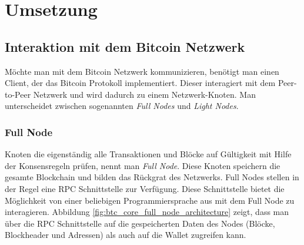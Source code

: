 \section{Umsetzung}

\subsection{Interaktion mit dem Bitcoin Netzwerk}

Möchte man mit dem Bitcoin Netzwerk kommunizieren, benötigt man einen Client, der das Bitcoin Protokoll implementiert. Dieser interagiert mit dem Peer-to-Peer Netzwerk und wird dadurch zu einem Netzwerk-Knoten. Man unterscheidet zwischen sogenannten \textit{Full Nodes} und \textit{Light Nodes}.
\subsubsection{Full Node}
Knoten die eigenständig alle Transaktionen und Blöcke auf Gültigkeit mit Hilfe der Konsensregeln prüfen, nennt man \textit{Full Node}. Diese Knoten speichern die gesamte Blockchain und bilden das Rückgrat des Netzwerks.
Full Nodes stellen in der Regel eine RPC Schnittstelle zur Verfügung. Diese Schnittstelle bietet die Möglichkeit von einer beliebigen Programmiersprache aus mit dem Full Node zu interagieren.
Abbildung \ref{fig:btc_core_full_node_architecture} zeigt, dass man über die RPC Schnittstelle auf die gespeicherten Daten des Nodes (Blöcke, Blockheader und Adressen) als auch auf die Wallet zugreifen kann.

